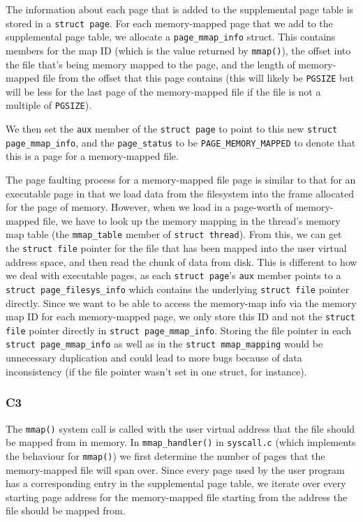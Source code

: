 \documentclass[a4wide, 11pt]{article}
\newcommand{\tx}{\texttt}
\begin{document}
The information about each page that is added to the supplemental page table is stored in a \tx{struct page}. For each memory-mapped page that we add to the supplemental page table, we allocate a \tx{page\_mmap\_info} struct. This contains members for the map ID (which is the value returned by \tx{mmap()}), the offset into the file that's being memory mapped to the page, and the length of memory-mapped file from the offset that this page contains (this will likely be \tx{PGSIZE} but will be less for the last page of the memory-mapped file if the file is not a multiple of \tx{PGSIZE}).

We then set the \tx{aux} member of the \tx{struct page} to point to this new \tx{struct page\_mmap\_info}, and the \tx{page\_status} to be \tx{PAGE\_MEMORY\_MAPPED} to denote that this is a page for a memory-mapped file.

The page faulting process for a memory-mapped file page is similar to that for an executable page in that we load data from the filesystem into the frame allocated for the page of memory. However, when we load in a page-worth of memory-mapped file, we have to look up the memory mapping in the thread's memory map table (the \tx{mmap\_table} member of \tx{struct thread}). From this, we can get the \tx{struct file} pointer for the file that has been mapped into the user virtual address space, and then read the chunk of data from disk. This is different to how we deal with executable pages, as each \tx{struct page}'s \tx{aux} member points to a \tx{struct page\_filesys\_info} which contains the underlying \tx{struct file} pointer directly. Since we want to be able to access the memory-map info via the memory map ID for each memory-mapped page, we only store this ID and not the \tx{struct file} pointer directly in \tx{struct page\_mmap\_info}. Storing the file pointer in each \tx{struct page\_mmap\_info} as well as in the \tx{struct mmap\_mapping} would be unnecessary duplication and could lead to more bugs because of data inconsistency (if the file pointer wasn't set in one struct, for instance).

\subsubsection{C3}

The \tx{mmap()} system call is called with the user virtual address that the file should be mapped from in memory. In \tx{mmap\_handler()} in \tx{syscall.c} (which implements the behaviour for \tx{mmap()}) we first determine the number of pages that the memory-mapped file will span over. Since every page used by the user program has a corresponding entry in the supplemental page table, we iterate over every starting page address for the memory-mapped file starting from the address the file should be mapped from.
\end{document}
